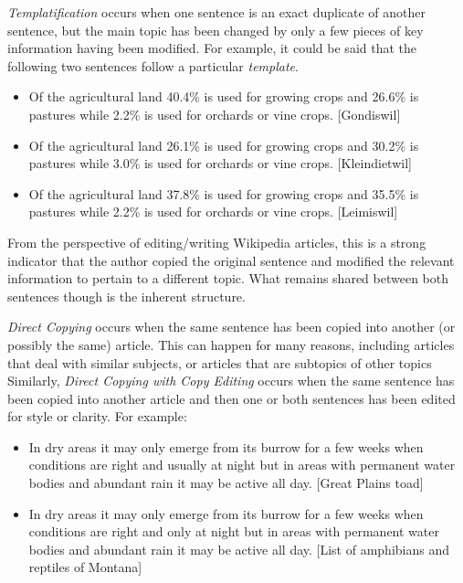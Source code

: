 \documentclass{acm_proc_article-sp}
\begin{document}
 \emph{Templatification} occurs when one sentence is an exact duplicate of another sentence, but the main topic has been changed by only a few pieces of key information having been modified. For example, it could be said that the following two sentences follow a particular \emph{template}.
\begin{itemize}[noitemsep,nolistsep]

\item Of the agricultural land 40.4\% is used for growing crops and 26.6\% is pastures while 2.2\% is used for orchards or vine crops. [Gondiswil]
\item Of the agricultural land 26.1\% is used for growing crops and 30.2\% is pastures while 3.0\% is used for orchards or vine crops. [Kleindietwil]
\item Of the agricultural land 37.8\% is used for growing crops and 35.5\% is pastures while 2.2\% is used for orchards or vine crops. [Leimiswil]

\end{itemize}
From the perspective of editing/writing Wikipedia articles, this is a strong indicator that the author copied the original sentence and modified the relevant information to pertain to a different topic. What remains shared between both sentences though is the inherent structure.

\emph{Direct Copying} occurs when the same sentence has been copied into another (or possibly the same) article. This can happen for many reasons, including articles that deal with similar subjects, or articles that are subtopics of other topics Similarly, \emph{Direct Copying with Copy Editing} occurs when the same sentence has been copied into another article and then one or both sentences has been edited for style or clarity. For example:
\begin{itemize}[noitemsep,nolistsep]
\item In dry areas it may only emerge from its burrow for a few weeks when conditions are right and usually at night but in areas with permanent water bodies and abundant rain it may be active all day. [Great Plains toad]
\item In dry areas it may only emerge from its burrow for a few weeks when conditions are right and only at night but in areas with permanent water bodies and abundant rain it may be active all day. [List of amphibians and reptiles of Montana]
\end{itemize}
\end{document}
